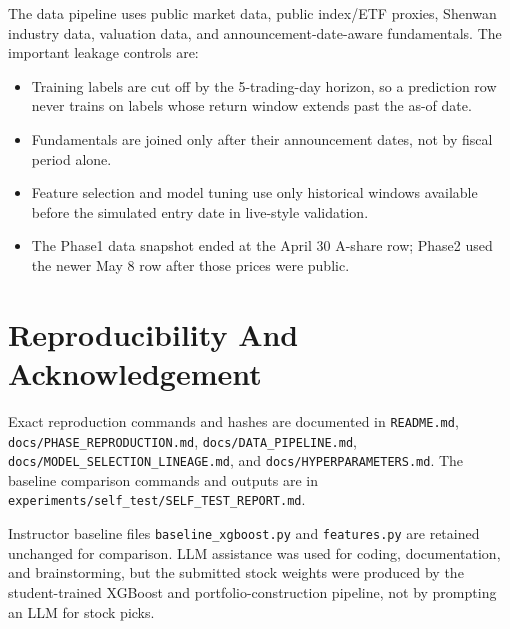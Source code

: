 \documentclass[11pt]{article}
\begin{document}
The data pipeline uses public market data, public index/ETF proxies, Shenwan
industry data, valuation data, and announcement-date-aware fundamentals. The
important leakage controls are:

\begin{itemize}
  \item Training labels are cut off by the 5-trading-day horizon, so a prediction row never trains on labels whose return window extends past the as-of date.
  \item Fundamentals are joined only after their announcement dates, not by fiscal period alone.
  \item Feature selection and model tuning use only historical windows available before the simulated entry date in live-style validation.
  \item The Phase1 data snapshot ended at the April 30 A-share row; Phase2 used the newer May 8 row after those prices were public.
\end{itemize}

\clearpage

\section{Reproducibility And Acknowledgement}

Exact reproduction commands and hashes are documented in \texttt{README.md},
\texttt{docs/PHASE\_REPRODUCTION.md}, \texttt{docs/DATA\_PIPELINE.md},
\texttt{docs/MODEL\_SELECTION\_LINEAGE.md}, and
\texttt{docs/HYPERPARAMETERS.md}. The baseline comparison commands and outputs
are in \texttt{experiments/self\_test/SELF\_TEST\_REPORT.md}.

Instructor baseline files \texttt{baseline\_xgboost.py} and \texttt{features.py}
are retained unchanged for comparison. LLM assistance was used for coding,
documentation, and brainstorming, but the submitted stock weights were produced
by the student-trained XGBoost and portfolio-construction pipeline, not by
prompting an LLM for stock picks.
\end{document}
